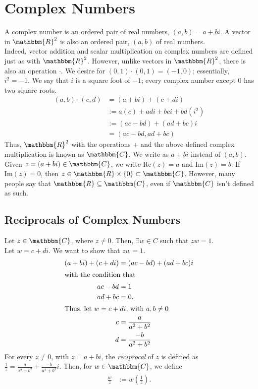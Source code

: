 \documentclass[10pt]{extarticle}
\title{}
\author{}
\date{}
\newcommand{\R}{\mathbbm{R}}
\newcommand{\C}{\mathbbm{C}}
\begin{document}
\section{Complex Numbers}%
  A complex number is an ordered pair of real numbers, $(a,b)=a+bi$. A vector in $\R^2$ is also an ordered pair, $(a,b)$ of real numbers.\\

  Indeed, vector addition and scalar multiplication on complex numbers are defined just as with $\R^2$. However, unlike vectors in $\R^2$, there is also an operation $\cdot$. We desire for $(0,1)\cdot (0,1) = (-1,0)$; essentially, $i^2 = -1$. We say that $i$ is a square foot of $-1$; every complex number except $0$ has two square roots.
  \begin{align*}
    (a,b)\cdot (c,d) &= (a+bi) + (c+di)\\
                     &:= a(c) + adi + bci + bd(i^2)\\
                     &:= (ac-bd) + (ad+bc)i\\
                     &= (ac-bd,ad+bc)
  \end{align*}
  Thus, $\R^2$ with the operations $+$ and the above defined complex multiplication is known as $\C$. We write as $a+bi$ instead of $(a,b)$.\\

  Given $z=(a+bi)\in \C$, we write $\text{Re}(z) = a$ and $\text{Im}(z) = b$. If $\text{Im}(z) = 0$, then $z\in \R\times\{0\} \subset \C$. However, many people say that $\R\subseteq \C$, even if $\C$ isn't defined as such.
  \subsection{Reciprocals of Complex Numbers}%
  Let $z\in \C$, where $z\neq 0$. Then, $\exists w\in C$ such that $zw = 1$.\\

  Let $w = c+di$. We want to show that $zw = 1$.
  \begin{align*}
    (a+bi) + (c+di) &= (ac-bd) + (ad+bc)i\\
    \shortintertext{with the condition that}
    ac-bd &= 1\\
    ad + bc &= 0.\\
    \shortintertext{Thus, let $w = c+di$, with $a,b\neq 0$}
    c &= \frac{a}{a^2 + b^2}\\
    d &= \frac{-b}{a^2 + b^2}
  \end{align*}
  For every $z\neq 0$, with $z = a+bi$, the \textit{reciprocal} of $z$ is defined as $\frac{1}{z} = \frac{a}{a^2 + b^2} + \frac{-b}{a^2 + b^2}i$. Then, for $w\in \C$, we define
  \begin{align*}
    \frac{w}{z} &:= w \left(\frac{1}{z}\right).
  \end{align*}
\end{document}
